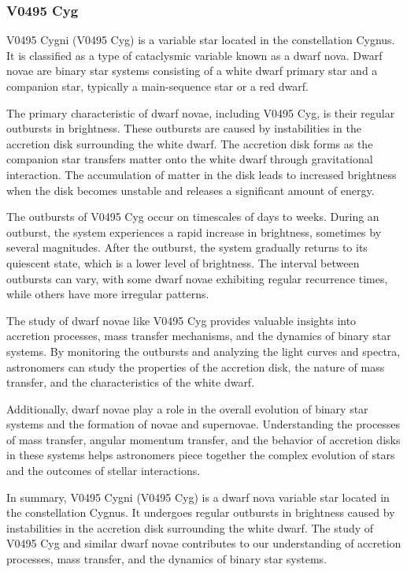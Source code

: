 \subsubsection*{ V0495 Cyg }

V0495 Cygni (V0495 Cyg) is a variable star located in the constellation Cygnus. It is classified as a type of cataclysmic variable known as a dwarf nova. Dwarf novae are binary star systems consisting of a white dwarf primary star and a companion star, typically a main-sequence star or a red dwarf.

The primary characteristic of dwarf novae, including V0495 Cyg, is their regular outbursts in brightness. These outbursts are caused by instabilities in the accretion disk surrounding the white dwarf. The accretion disk forms as the companion star transfers matter onto the white dwarf through gravitational interaction. The accumulation of matter in the disk leads to increased brightness when the disk becomes unstable and releases a significant amount of energy.

The outbursts of V0495 Cyg occur on timescales of days to weeks. During an outburst, the system experiences a rapid increase in brightness, sometimes by several magnitudes. After the outburst, the system gradually returns to its quiescent state, which is a lower level of brightness. The interval between outbursts can vary, with some dwarf novae exhibiting regular recurrence times, while others have more irregular patterns.

The study of dwarf novae like V0495 Cyg provides valuable insights into accretion processes, mass transfer mechanisms, and the dynamics of binary star systems. By monitoring the outbursts and analyzing the light curves and spectra, astronomers can study the properties of the accretion disk, the nature of mass transfer, and the characteristics of the white dwarf.

Additionally, dwarf novae play a role in the overall evolution of binary star systems and the formation of novae and supernovae. Understanding the processes of mass transfer, angular momentum transfer, and the behavior of accretion disks in these systems helps astronomers piece together the complex evolution of stars and the outcomes of stellar interactions.

In summary, V0495 Cygni (V0495 Cyg) is a dwarf nova variable star located in the constellation Cygnus. It undergoes regular outbursts in brightness caused by instabilities in the accretion disk surrounding the white dwarf. The study of V0495 Cyg and similar dwarf novae contributes to our understanding of accretion processes, mass transfer, and the dynamics of binary star systems.


